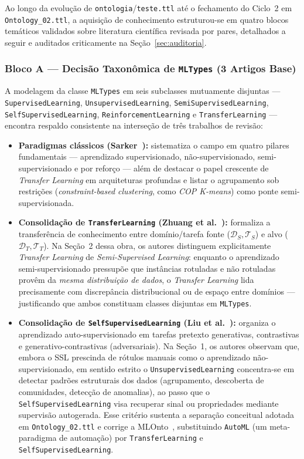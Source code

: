 \documentclass[11pt,a4paper]{article}
\newcommand{\onto}[1]{\texttt{#1}}
\begin{document}
Ao longo da evolução de \texttt{ontologia}/\texttt{teste.ttl} até o fechamento do Ciclo~2 em \texttt{Ontology\_02.ttl}, a aquisição de conhecimento estruturou-se em quatro blocos temáticos validados sobre literatura científica revisada por pares, detalhados a seguir e auditados criticamente na Seção~\ref{sec:auditoria}.

\subsubsection{Bloco A --- Decisão Taxonômica de \onto{MLTypes} (3 Artigos Base)}

A modelagem da classe \onto{MLTypes} em seis subclasses mutuamente disjuntas --- \onto{SupervisedLearning}, \onto{UnsupervisedLearning}, \onto{SemiSupervisedLearning}, \onto{SelfSupervisedLearning}, \onto{ReinforcementLearning} e \onto{TransferLearning} --- encontra respaldo consistente na interseção de três trabalhos de revisão:
\begin{itemize}[leftmargin=*,nosep]
  \item \textbf{Paradigmas clássicos (Sarker~\cite{sarker2021ml}):} sistematiza o campo em quatro pilares fundamentais --- aprendizado supervisionado, não-supervisionado, semi-supervisionado e por reforço --- além de destacar o papel crescente de \emph{Transfer Learning} em arquiteturas profundas e listar o agrupamento sob restrições (\emph{constraint-based clustering}, como \emph{COP K-means}) como ponte semi-supervisionada.
  \item \textbf{Consolidação de \onto{TransferLearning} (Zhuang et al.~\cite{zhuang2021transfer}):} formaliza a transferência de conhecimento entre domínio/tarefa fonte ($\mathcal{D}_S, \mathcal{T}_S$) e alvo ($\mathcal{D}_T, \mathcal{T}_T$). Na Seção~2 dessa obra, os autores distinguem explicitamente \emph{Transfer Learning} de \emph{Semi-Supervised Learning}: enquanto o aprendizado semi-supervisionado pressupõe que instâncias rotuladas e não rotuladas provêm da \emph{mesma distribuição de dados}, o \emph{Transfer Learning} lida precisamente com discrepância distribucional ou de espaço entre domínios --- justificando que ambos constituam classes disjuntas em \onto{MLTypes}.
  \item \textbf{Consolidação de \onto{SelfSupervisedLearning} (Liu et al.~\cite{liu2023self}):} organiza o aprendizado auto-supervisionado em tarefas pretexto generativas, contrastivas e generativo-contrastivas (adversariais). Na Seção~1, os autores observam que, embora o SSL prescinda de rótulos manuais como o aprendizado não-supervisionado, em sentido estrito o \onto{UnsupervisedLearning} concentra-se em detectar padrões estruturais dos dados (agrupamento, descoberta de comunidades, detecção de anomalias), ao passo que o \onto{SelfSupervisedLearning} visa recuperar sinal ou propriedades mediante super\-visão autogerada. Esse critério sustenta a separação conceitual adotada em \texttt{Ontology\_02.ttl} e corrige a MLOnto~\cite{braga2020mlonto}, substituindo \onto{AutoML} (um meta-paradigma de automação) por \onto{TransferLearning} e \onto{SelfSupervisedLearning}.
\end{itemize}
\end{document}
